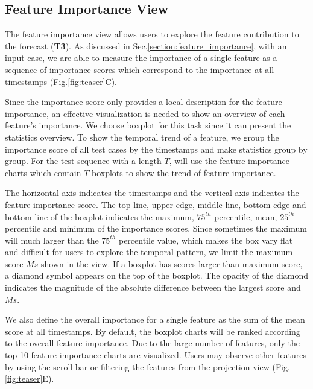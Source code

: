 \subsection{Feature Importance View}
The feature importance view allows users to explore the feature contribution to the forecast (\textbf{T3}).
As discussed in Sec.\ref{section:feature_importance}, with an input case, we are able to measure the importance of a single feature as a sequence of importance scores which correspond to the importance at all timestamps (Fig.\ref{fig:teaser}C). 

Since the importance score only provides a local description for the feature importance, an effective visualization is needed to show an overview of each feature's importance. We choose boxplot for this task since it can present the statistics overview. To show the temporal trend of a feature, we group the importance score of all test cases by the timestamps and make statistics group by group. For the test sequence with a length $T$, will use the feature importance charts which contain $T$ boxplots to show the trend of feature importance.

The horizontal axis indicates the timestamps and the vertical axis indicates the feature importance score. The top line, upper edge, middle line, bottom edge and bottom line of the boxplot indicates the maximum,  $75^{th}$ percentile, mean, $25^{th}$ percentile and minimum of the importance scores.  Since sometimes the maximum will much larger than the $75^{th}$  percentile value, which makes the box vary flat and difficult for users to explore the temporal pattern, we limit the maximum score $Ms$ shown in the view. If a boxplot has scores larger than maximum score, a diamond symbol appears on the top of the boxplot. The opacity of the diamond indicates the magnitude of the absolute difference between the largest score and $Ms$.    

We also define the overall importance for a single feature as the sum of the mean score at all timestamps. By default, the boxplot charts will be ranked according to the overall feature importance. Due to the large number of features, only the top 10 feature importance charts are visualized. Users may observe other features by using the scroll bar or filtering the features from the projection view (Fig.\ref{fig:teaser}E). 

